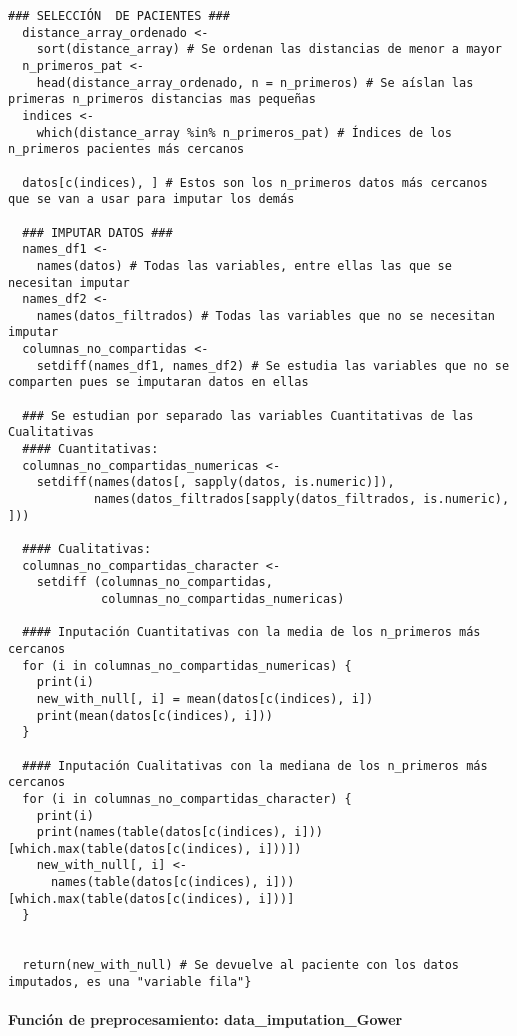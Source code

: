 \begin{lstlisting}[style=mystyle,caption={Input\_Gower.R}, label={lst:input-gower-fun}]
  ### SELECCIÓN  DE PACIENTES ###
  distance_array_ordenado <-
    sort(distance_array) # Se ordenan las distancias de menor a mayor
  n_primeros_pat <-
    head(distance_array_ordenado, n = n_primeros) # Se aíslan las primeras n_primeros distancias mas pequeñas
  indices <-
    which(distance_array %in% n_primeros_pat) # Índices de los n_primeros pacientes más cercanos
  
  datos[c(indices), ] # Estos son los n_primeros datos más cercanos que se van a usar para imputar los demás
  
  ### IMPUTAR DATOS ###
  names_df1 <-
    names(datos) # Todas las variables, entre ellas las que se necesitan imputar
  names_df2 <-
    names(datos_filtrados) # Todas las variables que no se necesitan imputar
  columnas_no_compartidas <-
    setdiff(names_df1, names_df2) # Se estudia las variables que no se comparten pues se imputaran datos en ellas
  
  ### Se estudian por separado las variables Cuantitativas de las Cualitativas
  #### Cuantitativas:
  columnas_no_compartidas_numericas <-
    setdiff(names(datos[, sapply(datos, is.numeric)]),
            names(datos_filtrados[sapply(datos_filtrados, is.numeric), ]))
  
  #### Cualitativas:
  columnas_no_compartidas_character <-
    setdiff (columnas_no_compartidas,
             columnas_no_compartidas_numericas)
  
  #### Inputación Cuantitativas con la media de los n_primeros más cercanos
  for (i in columnas_no_compartidas_numericas) {
    print(i)
    new_with_null[, i] = mean(datos[c(indices), i])
    print(mean(datos[c(indices), i]))
  }
  
  #### Inputación Cualitativas con la mediana de los n_primeros más cercanos
  for (i in columnas_no_compartidas_character) {
    print(i)
    print(names(table(datos[c(indices), i]))[which.max(table(datos[c(indices), i]))])
    new_with_null[, i] <-
      names(table(datos[c(indices), i]))[which.max(table(datos[c(indices), i]))]
  }
  
  
  return(new_with_null) # Se devuelve al paciente con los datos imputados, es una "variable fila"}
\end{lstlisting}


\newpage

\paragraph*{Función de preprocesamiento: data\_imputation\_Gower}\label{sec:codigo-input-gower-fun-preprocesamiento}

